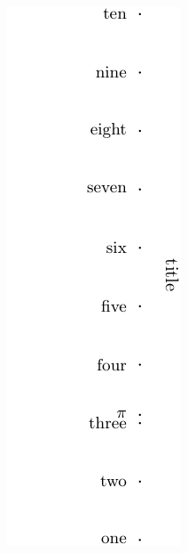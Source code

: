 \documentclass[a4paper,11pt,english]{sphinxmanual}
\begin{document}
\includegraphics{ex_axes_5.pdf}
\end{document}
